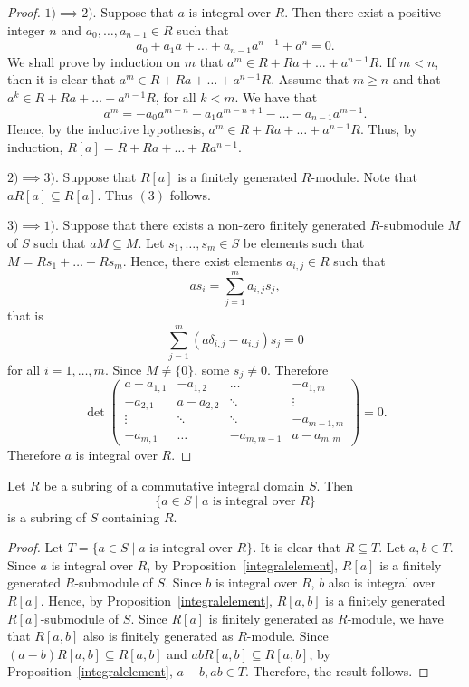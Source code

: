 \begin{proof}
    $1)\implies 2).$ Suppose that $a$ is integral over $R$. Then there exist a positive integer $n$ and $a_0,\dots ,a_{n-1}\in R$ 
    such that
    \[ a_0+a_1a+\dots +a_{n-1}a^{n-1}+a^n=0.\]
    We shall prove by induction on $m$ that $a^m\in R+Ra+\dots +a^{n-1}R$. If $m<n$, then it is clear that 
    $a^m\in R+Ra+\dots +a^{n-1}R$. Assume that $m\geq n$ and that $a^k\in R+Ra+\dots +a^{n-1}R$, for all $k<m$. We have that
    \[ a^m=-a_0a^{m-n}-a_1a^{m-n+1}-\dots -a_{n-1}a^{m-1}.\]
    Hence, by the inductive hypothesis, $a^m\in R+Ra+\dots +a^{n-1}R$. Thus, by induction, $R[a]=R+Ra+\dots +Ra^{n-1}$.
    
    $2)\implies 3)$. Suppose that $R[a]$ is a finitely generated $R$-module. Note that $aR[a]\subseteq R[a]$. Thus $(3)$ follows.
    
    $3)\implies 1)$. Suppose that there exists a non-zero finitely generated $R$-submodule $M$ of $S$ such that $aM\subseteq M$. 
    Let $s_1,\dots ,s_m\in S$ be elements such that
    $M=Rs_1+\dots +Rs_m$. Hence, there exist elements $a_{i,j}\in R$ such that
    \[ as_i=\sum_{j=1}^ma_{i,j}s_j,\]
    that is
    \[\sum_{j=1}^m(a\delta_{i,j}-a_{i,j})s_j=0\]
    for all $i=1,\dots ,m$. Since $M\neq\{0\}$, some $s_j\neq 0$. Therefore
    \[\det\left(\begin{array}{cccc}
    a-a_{1,1}&-a_{1,2}&\ldots&-a_{1,m}\\
    -a_{2,1}&a-a_{2,2}&\ddots&\vdots\\
    \vdots&\ddots&\ddots&-a_{m-1,m}\\
    -a_{m,1}&\ldots&-a_{m,m-1}&a-a_{m,m}\end{array}\right)=0.\]
    Therefore $a$ is integral over $R$.
\end{proof}

\begin{corollary}\label{integralclousure}
    Let $R$ be a subring of a commutative integral domain $S$. Then 
    \[ \{ a\in S\mid a \mbox{ is integral over }R\}\]
    is a subring of $S$ containing $R$.
\end{corollary}

\begin{proof}
    Let $T=\{ a\in S\mid a \mbox{ is integral over }R\}$. It is clear that $R\subseteq T$. Let $a,b\in T$. 
    Since $a$ is integral over $R$,  by Proposition~\ref{integralelement}, $R[a]$ is a finitely generated $R$-submodule of $S$.
    Since $b$ is integral over $R$, $b$ also is integral over $R[a]$. Hence, by Proposition~\ref{integralelement}, 
    $R[a,b]$ is a finitely generated $R[a]$-submodule of $S$. Since $R[a]$ is finitely generated as $R$-module, we have that
    $R[a,b]$ also is finitely generated as $R$-module. Since $(a-b)R[a,b]\subseteq R[a,b]$ and $abR[a,b]\subseteq R[a,b]$, 
    by Proposition~\ref{integralelement}, $a-b,ab\in T$. Therefore, the result follows. 
\end{proof}

